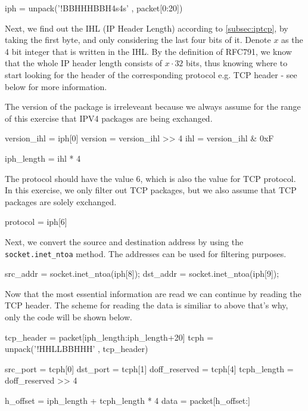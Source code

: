 \documentclass[11pt, a4paper]{article}
\begin{document}
\begin{python}
iph = unpack('!BBHHHBBH4s4s' , packet[0:20])
\end{python}

Next, we find out the IHL (IP Header Length) according to
\ref{subsec:iptcp}, by taking the first byte, and only considering the
last four bits of it. Denote $x$ as the 4 bit integer that is written
in the IHL. By the definition of RFC791\cite{rfc791}, we know that the
whole IP header length consists of $x \cdot 32$ bits, thus knowing
where to start looking for the header of the corresponding protocol
e.g. TCP header - see below for more information.

The version of the package is irreleveant because we always assume for
the range of this exercise that IPV4 packages are being exchanged.

\begin{python}
version_ihl = iph[0]
version = version_ihl >> 4
ihl = version_ihl & 0xF

iph_length = ihl * 4
\end{python}

The protocol should have the value 6, which is also the value for TCP
protocol. In this exercise, we only filter out TCP packages, but we
also assume that TCP packages are solely exchanged. 

\begin{python}
protocol = iph[6]
\end{python}

Next, we convert the source and destination address by using the
\lstinline|socket.inet_ntoa| method. The addresses can be used for
filtering purposes. 

\begin{python}
src_addr = socket.inet_ntoa(iph[8]);
dst_addr = socket.inet_ntoa(iph[9]);
\end{python}

Now that the most essential information are read we can continue by
reading the TCP header. The scheme for reading the data is similiar to
above that's why, only the code will be shown below. 

\begin{python}
tcp_header = packet[iph_length:iph_length+20]
tcph = unpack('!HHLLBBHHH' , tcp_header)

src_port = tcph[0]
dst_port = tcph[1]
doff_reserved = tcph[4]
tcph_length = doff_reserved >> 4

h_offset = iph_length + tcph_length * 4
data = packet[h_offset:]
\end{python}
\end{document}
